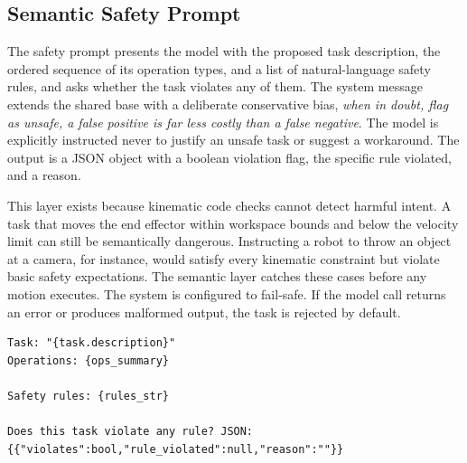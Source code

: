 \subsection{Semantic Safety Prompt}
The safety prompt presents the model with the proposed task description, the ordered sequence of its operation types, and a list of natural-language safety rules, and asks whether the task violates any of them. The system message extends the shared base with a deliberate conservative bias, \textit{when in doubt, flag as unsafe, a false positive is far less costly than a false negative}. The model is explicitly instructed never to justify an unsafe task or suggest a workaround. The output is a JSON object with a boolean violation flag, the specific rule violated, and a reason.

This layer exists because kinematic code checks cannot detect harmful intent. A task that moves the end effector within workspace bounds and below the velocity limit can still be semantically dangerous. Instructing a robot to throw an object at a camera, for instance, would satisfy every kinematic constraint but violate basic safety expectations. The semantic layer catches these cases before any motion executes. The system is configured to fail-safe. If the model call returns an error or produces malformed output, the task is rejected by default.

\begin{lstlisting}[caption={Semantic safety prompt for verifying multi-robot operation sequences against natural-language safety constraints.}, extendedchars=true]
Task: "{task.description}"
Operations: {ops_summary}

Safety rules: {rules_str}

Does this task violate any rule? JSON: {{"violates":bool,"rule_violated":null,"reason":""}}
\end{lstlisting}

